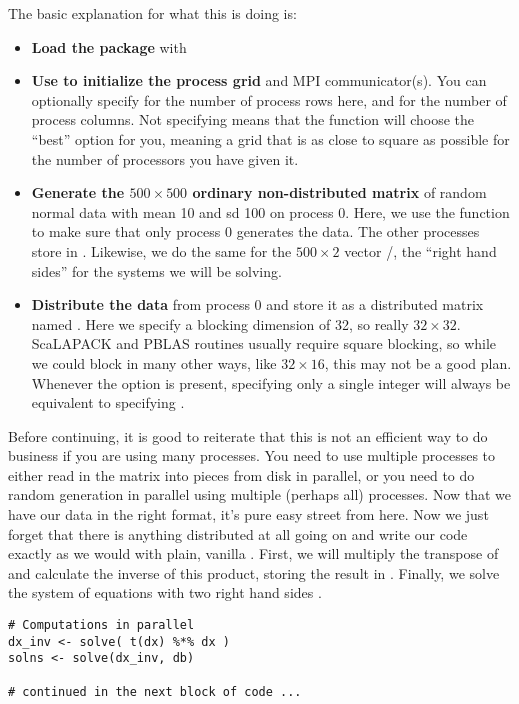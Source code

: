 The basic explanation for what this is doing is:
\begin{itemize}
 \item \textbf{Load the package} with 
 \item \textbf{Use  to initialize the process grid} and MPI communicator(s).  You can optionally specify  for the number of process rows here, and  for the number of process columns.  Not specifying means that the function will choose the ``best'' option for you, meaning a grid that is as close to square as possible for the number of processors you have given it.
 \item \textbf{Generate the $500\times 500$ ordinary non-distributed  matrix} of random normal data with mean 10 and sd 100 on process 0.  Here, we use the  function  to make sure that only process 0 generates the data.  The other processes store  in .  Likewise, we do the same for the $500\times 2$ vector /, the ``right hand sides'' for the systems we will be solving.
 \item \textbf{Distribute the data} from process 0 and store it as a distributed matrix named .  Here we specify a blocking dimension of 32, so really $32\times 32$.  ScaLAPACK and PBLAS routines usually require square blocking, so while we could block in many other ways, like $32\times 16$, this may not be a good plan.   Whenever the  option is present, specifying only a single integer  will always be equivalent to specifying .
\end{itemize}

Before continuing, it is good to reiterate that this is not an efficient way to do business if you are using many processes.  You need to use multiple processes to either read in the matrix into pieces from disk in parallel, or you need to do random generation in parallel using multiple (perhaps all) processes.
\np
Now that we have our data in the right format, it's pure easy street from here.  Now we just forget that there is anything distributed at all going on and write our code exactly as we would with plain, vanilla .  First, we will multiply the transpose of  and calculate the inverse of this product, storing the result in .  Finally, we solve the system of equations with two right hand sides .

\begin{lstlisting}[language=rr,title=Simple Matrix Operations]
# Computations in parallel
dx_inv <- solve( t(dx) %*% dx )
solns <- solve(dx_inv, db)

# continued in the next block of code ...
\end{lstlisting}

